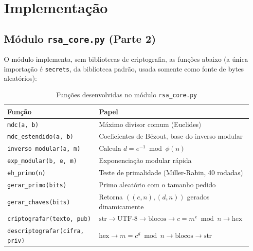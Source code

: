 \documentclass[11pt, a4paper]{article}
\begin{document}
\section{Implementação}

\subsection{Módulo \texttt{rsa\_core.py} (Parte 2)}
O módulo implementa, sem bibliotecas de criptografia, as funções abaixo (a única importação é \texttt{secrets}, da biblioteca padrão, usada somente como fonte de bytes aleatórios):

\begin{table}[h!]
    \centering
    \caption{Funções desenvolvidas no módulo \texttt{rsa\_core.py}}
    \begin{tabular}{ll}
        \toprule
        \textbf{Função} & \textbf{Papel} \\
        \midrule
        \texttt{mdc(a, b)} & Máximo divisor comum (Euclides) \\
        \texttt{mdc\_estendido(a, b)} & Coeficientes de Bézout, base do inverso modular \\
        \texttt{inverso\_modular(a, m)} & Calcula $d = e^{-1} \bmod \phi(n)$ \\
        \texttt{exp\_modular(b, e, m)} & Exponenciação modular rápida \\
        \texttt{eh\_primo(n)} & Teste de primalidade (Miller-Rabin, 40 rodadas) \\
        \texttt{gerar\_primo(bits)} & Primo aleatório com o tamanho pedido \\
        \texttt{gerar\_chaves(bits)} & Retorna $((e, n), (d, n))$ gerados dinamicamente \\
        \texttt{criptografar(texto, pub)} & $\text{str} \rightarrow \text{UTF-8} \rightarrow \text{blocos} \rightarrow c = m^e \bmod n \rightarrow \text{hex}$ \\
        \texttt{descriptografar(cifra, priv)} & $\text{hex} \rightarrow m = c^d \bmod n \rightarrow \text{blocos} \rightarrow \text{str}$ \\
        \bottomrule
    \end{tabular}
\end{table}
\end{document}
